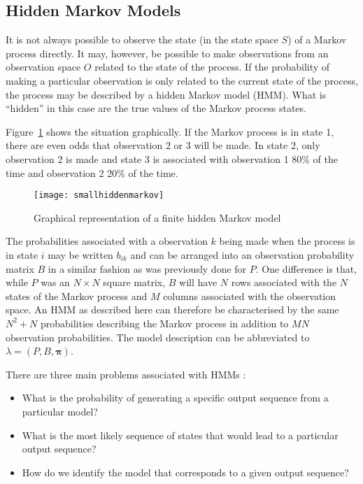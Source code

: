 \subsection{Hidden Markov Models} 
It is not always possible to observe the state (in the state space
$S$) of a Markov process directly. It may, however, be possible to
make observations from an observation space $O$ related to the state
of the process. If the probability of making a particular observation
is only related to the current state of the process, the process may
be described by a hidden Markov model (HMM). What is ``hidden'' in
this case are the true values of the Markov process states.

Figure~\ref{fig:hiddenmarkov} shows the situation graphically. If the
Markov process is in state 1, there are even odds that observation 2
or 3 will be made. In state 2, only observation 2 is made and state 3
is associated with observation 1 80\% of the time and observation 2
20\% of the time.

\begin{figure}[htbp]
  \centering
  \texttt{[image: smallhiddenmarkov]}
  \caption{Graphical representation of a finite hidden Markov model}
  \label{fig:hiddenmarkov}
\end{figure}

The probabilities associated with a observation $k$ being made when
the process is in state $i$ may be written $b_{ik}$ and can be
arranged into an observation probability matrix $B$ in a similar
fashion as was previously done for $P$. One difference is that, while
$P$ was an $N \times N$ square matrix, $B$ will have $N$ rows
associated with the $N$ states of the Markov process and $M$ columns
associated with the observation space. An HMM as described here can
therefore be characterised by the same $N^2+N$ probabilities describing
the Markov process in addition to $MN$ observation probabilities.  The
model description can be abbreviated to $\lambda = (P, B, \boldsymbol{\pi})$.

There are three main problems associated with HMMs \citep{gamerman_markov_2006}:
\begin{itemize}
\item What is the probability of generating a specific output sequence
  from a particular model?
\item What is the most likely sequence of states that would lead to a
  particular output sequence?
\item How do we identify the model that corresponds to a given output
  sequence?
\end{itemize}

